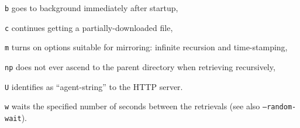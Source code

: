 \begin{enumx}
\item [\texttt{b}] goes to background immediately after startup,
\item [\texttt{c}] continues getting a partially-downloaded file,
\item [\texttt{m}] turns on options suitable for mirroring: 
	infinite recursion and time-stamping,
\item [\texttt{np}] does not ever ascend to the
	parent directory when retrieving recursively,
\item [\texttt{U}] identifies as ``agent-string'' to the HTTP server.
\item [\texttt{w}] waits the specified number of seconds 
	between the retrievals (see also \texttt{--random-wait}).
\end{enumx}
